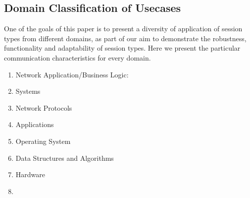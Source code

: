 
\begin{comment}
For example Scribble code:
%
\begin{lstlisting}
  msg(int) from A to B;
\end{lstlisting}
%
describes the global protocol between role \lstinline|A| and \lstinline|B|,
where participant \lstinline|A| sends message of type \lstinline|msg(int)|
to participant \lstinline|B|. From the local perspective of participant
\lstinline|A| the protocol would be:
%
\begin{lstlisting}
  msg(int) to B;
\end{lstlisting}
%
where it describes the sending of message \lstinline|msg(int)|
to participant \lstinline|B|.
\end{comment}



\subsection{Domain Classification of Usecases}

One of the goals of this paper is to present a diversity
of application of session types from different domains, as
part of our aim to demonstrate the robustness, functionality
and adaptability of session types. Here we present the particular
communication characteristics for every domain.


\begin{enumerate}
	\item	Network Application/Business Logic:

	\item	Systems

	\item	Network Protocols

	\item	Applications

	\item	Operating System

	\item	Data Structures and Algorithms

	\item	Hardware

	\item	{}
\end{enumerate}



